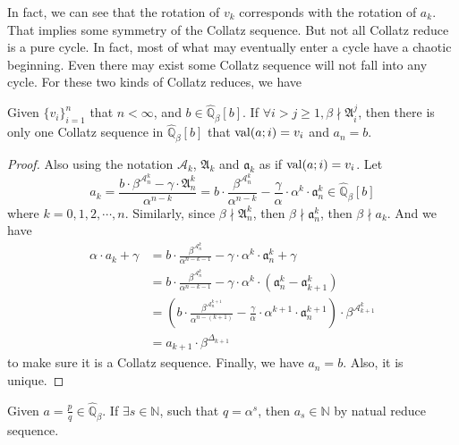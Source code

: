 In fact, we can see that the rotation of $v_{k}$ corresponds with the rotation of $a_k$.
That implies some symmetry of the Collatz sequence.
But not all Collatz reduce is a pure cycle.
In fact, most of  what may eventually enter a cycle have a chaotic beginning.
Even there may exist some Collatz sequence will not fall into any cycle.
For these two kinds of Collatz reduces, we have
\begin{theorem}\label{theorem:any-presequence}
    Given $\{v_{i}\}_{i=1}^{n}$ that $n < \infty$, and $b \in \widehat{\mathbb{Q}}_\beta[b]$.
    If $\forall i>j\ge1, \beta \nmid \mathfrak{A}_i^{j}$, then there is only one Collatz sequence in $\widehat{\mathbb{Q}}_{{\beta}}[b]$ that $\operatorname{val}(a;i) = v_{i}$ and $a_n = b$.
\end{theorem}
\begin{proof}
    Also using the notation $\mathcal{A}_k$, $\mathfrak{A}_k$ and $\mathfrak{a}_k$ as if $\operatorname{val}(a;i) = v_{i}$.
    Let
    \[ a_k = \frac{b \cdot \beta^{\mathcal{A}_n^{k}} - \gamma\cdot\mathfrak{A}_n^{k}}{\alpha^{n-k}} = b \cdot \frac{\beta^{\mathcal{A}_n^{k}}}{\alpha^{n-k}}  - \frac{\gamma}{\alpha}\cdot\alpha^{k}\cdot\mathfrak{a}_n^{k} \in \widehat{\mathbb{Q}}_{{\beta}}[b] \]
    where $k = 0, 1, 2, \cdots, n$.
    Similarly, since $\beta \nmid \mathfrak{A}_n^k$, then $\beta \nmid \mathfrak{a}_n^{k}$, then $\beta \nmid a_k$.
    And we have
    \begin{align*}
        \alpha \cdot a_k + \gamma &= b \cdot \frac{\beta^{\mathcal{A}_n^{k}}}{\alpha^{n-k-1}}  - \gamma\cdot\alpha^{k}\cdot\mathfrak{a}_n^{k} + \gamma \\
        &= b \cdot \frac{\beta^{\mathcal{A}_n^{k}}}{\alpha^{n-k-1}}  - \gamma\cdot\alpha^{k}\cdot\left(\mathfrak{a}_n^{k} - \mathfrak{a}_{k+1}^{k}\right) \\
        &= \left(b \cdot \frac{\beta^{\mathcal{A}_n^{k+1}}}{\alpha^{n-(k+1)}}  - \frac{\gamma}{\alpha}\cdot\alpha^{k+1}\cdot\mathfrak{a}_{n}^{k+1}\right) \cdot \beta^{\mathcal{A}_{k+1}^{k}} \\
        &= a_{k+1} \cdot \beta^{\Delta_{k+1}}
    \end{align*}
    to make sure it is a Collatz sequence.
    Finally, we have $a_n = b$.
    Also, it is unique.
\end{proof}
\begin{corollary}
    Given $a = \frac{   p}{q}\in \widehat{\mathbb{Q}}_{{\beta}}$. If $\exists s\in \mathbb{N}$, such that $q = \alpha^{s}$, then $a_{s} \in \mathbb{N}$ by natual reduce sequence.
\end{corollary}

